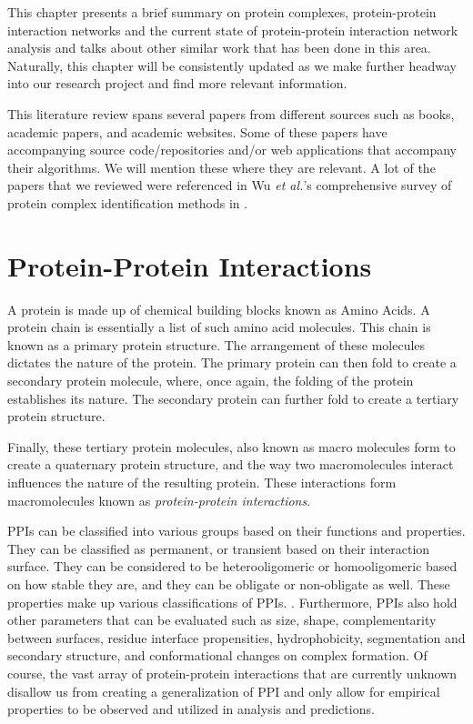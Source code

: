 \newcommand{\ppi}{Protein-Protein Interactions (PPI)}
\newcommand{\p}{Protein}

This chapter presents a brief summary on protein complexes, protein-protein 
interaction networks and the current state of protein-protein interaction network 
analysis and talks about other similar work that has been done in this area. 
Naturally, this chapter will be consistently updated as we make further headway 
into our research project and find more relevant information. 

This literature review spans several papers from different sources such as books, 
academic papers, and academic websites. Some of these papers have accompanying 
source code/repositories and/or web applications that accompany their algorithms. 
We will mention these where they are relevant. A lot of the papers that we 
reviewed were referenced 
in Wu \textit{et al.}'s comprehensive survey of protein complex identification methods in \cite{wu_comprehensive_2020}.

\section{Protein-Protein Interactions}
A protein is made up of chemical building blocks known as Amino Acids. A protein 
chain is essentially a list of such amino acid molecules. This chain is known as a
primary protein structure. The arrangement of these molecules dictates the nature 
of the protein. The primary protein can then fold to create a secondary protein 
molecule, where, once again, the folding of the protein establishes its nature. The secondary protein can further fold to create a tertiary protein structure. 

Finally, these tertiary protein molecules, also known as macro molecules form to create a quaternary protein structure, and the way two macromolecules interact influences the nature of the resulting protein. These interactions form macromolecules known as \emph{protein-protein interactions}.

PPIs can be classified into various groups based on their functions and properties. They can be classified as 
permanent, or transient based on their interaction surface. They can be considered to be heterooligomeric or 
homooligomeric based on how stable they are, and they can be obligate or non-obligate as well. These properties
make up various classifications of PPIs. \cite{Ijaz18}. Furthermore, PPIs also hold other parameters that can 
be evaluated such as size, shape, complementarity between surfaces, residue interface propensities, 
hydrophobicity, segmentation and secondary structure, and conformational changes on complex 
formation\cite{jones_principles_1996}. Of course, the vast array of protein-protein interactions that are 
currently unknown disallow us from creating a generalization of PPI and only allow for empirical properties to 
be observed and utilized in analysis and predictions.
 
